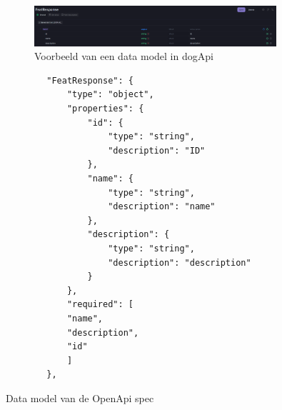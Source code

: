 \begin{figure}
    \centering
    \includegraphics[width=0.8\textwidth]{data-model-voorbeeld.png}
    \caption[Voorbeeld end point.]{\label{fig:data-model-voorbeeld}Voorbeeld van een data model in dogApi}
\end{figure}

\begin{listing}
    \begin{verbatim}
        "FeatResponse": {
            "type": "object",
            "properties": {
                "id": {
                    "type": "string",
                    "description": "ID"
                },
                "name": {
                    "type": "string",
                    "description": "name"
                },
                "description": {
                    "type": "string",
                    "description": "description"
                }
            },
            "required": [
            "name",
            "description",
            "id"
            ]
        },
        \end{verbatim}
        \caption[openAPIDataModelSpec]{Data model van de OpenApi spec}
    \end{listing}